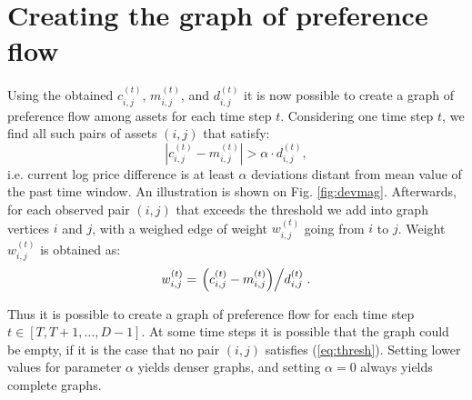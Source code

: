 \documentclass[lmodern, utf8, diplomski]{fer}
\begin{document}
  \section{Creating the graph of preference flow}
  \label{sub:creating-graph}
  Using the obtained $c_{i,j}^{(t)}$, $m_{i,j}^{(t)}$, and $d_{i,j}^{(t)}$ it is now possible to create a graph of preference flow among assets for each time step $t$.
  Considering one time step $t$, we find all such pairs of assets $(i,j)$ that satisfy:
  \begin{equation}
  \label{eq:thresh}
  \left| c_{i,j}^{(t)} - m_{i,j}^{(t)} \right| > \alpha \cdot d_{i,j}^{(t)},
  \end{equation}
  i.e. current log price difference is at least $\alpha$ deviations distant from mean value of the past time window.
  An illustration is shown on Fig. \ref{fig:devmag}.
  Afterwards, for each observed pair $(i,j)$ that exceeds the threshold we add into graph vertices $i$ and $j$, with a weighed edge of weight $w_{i,j}^{(t)}$ going from $i$ to $j$.
  Weight $w_{i,j}^{(t)}$ is obtained as:
  \begin{equation}
  \label{eq:weight}
  w_{i,j}^{(t)} = \left. \left(c_{i,j}^{(t)} - m_{i,j}^{(t)}\right) \middle/ d_{i,j}^{(t)} \right..
  \end{equation}
  
  Thus it is possible to create a graph of preference flow for each time step $t \in \left[T, T + 1, \ldots, D-1\right]$.
  At some time steps it is possible that the graph could be empty, if it is the case that no pair $(i,j)$ satisfies (\ref{eq:thresh}).
  Setting lower values for parameter $\alpha$ yields denser graphs, and setting $\alpha = 0$ always yields complete graphs.
  
\end{document}
